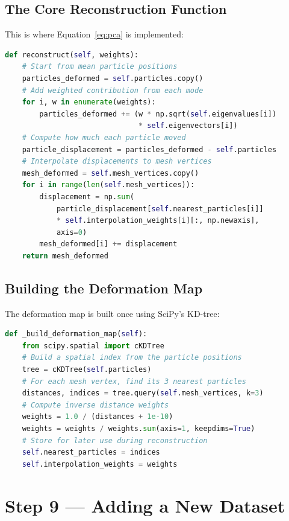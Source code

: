 \documentclass[12pt,a4paper]{article}
\begin{document}
\subsection{The Core Reconstruction Function}

This is where Equation~\ref{eq:pca} is implemented:

\begin{lstlisting}[language=Python, title={\textbf{PCA shape reconstruction}}]
def reconstruct(self, weights):
    # Start from mean particle positions
    particles_deformed = self.particles.copy()
    # Add weighted contribution from each mode
    for i, w in enumerate(weights):
        particles_deformed += (w * np.sqrt(self.eigenvalues[i])
                               * self.eigenvectors[i])
    # Compute how much each particle moved
    particle_displacement = particles_deformed - self.particles
    # Interpolate displacements to mesh vertices
    mesh_deformed = self.mesh_vertices.copy()
    for i in range(len(self.mesh_vertices)):
        displacement = np.sum(
            particle_displacement[self.nearest_particles[i]]
            * self.interpolation_weights[i][:, np.newaxis],
            axis=0)
        mesh_deformed[i] += displacement
    return mesh_deformed
\end{lstlisting}

\subsection{Building the Deformation Map}

The deformation map is built once using SciPy's KD-tree:

\begin{lstlisting}[language=Python, title={\textbf{KD-tree for nearest neighbor interpolation}}]
def _build_deformation_map(self):
    from scipy.spatial import cKDTree
    # Build a spatial index from the particle positions
    tree = cKDTree(self.particles)
    # For each mesh vertex, find its 3 nearest particles
    distances, indices = tree.query(self.mesh_vertices, k=3)
    # Compute inverse distance weights
    weights = 1.0 / (distances + 1e-10)
    weights = weights / weights.sum(axis=1, keepdims=True)
    # Store for later use during reconstruction
    self.nearest_particles = indices
    self.interpolation_weights = weights
\end{lstlisting}

\section{Step 9 --- Adding a New Dataset}
\end{document}
